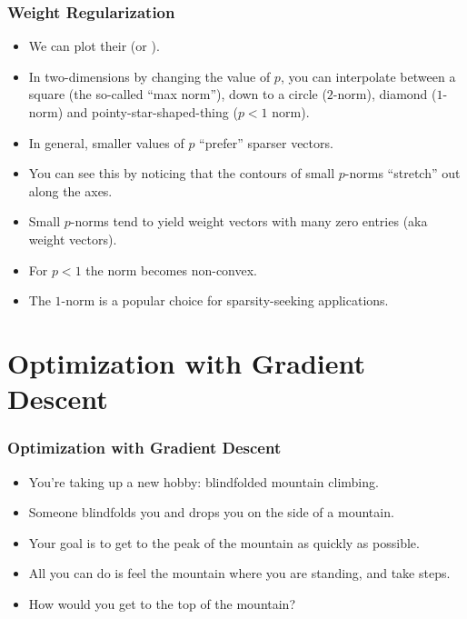 \documentclass[trans]{beamer}
\begin{document}
\begin{frame}
  \frametitle{Weight Regularization}
\begin{itemize}
\item
We can plot their 
(or ).
\item In two-dimensions by changing the value of $p$, you can interpolate between a
square (the so-called ``max norm''), down to a circle ($2$-norm),
diamond ($1$-norm) and pointy-star-shaped-thing ($p<1$ norm).
\item
In general, smaller values of $p$ ``prefer'' sparser vectors.  
\item You can
see this by noticing that the contours of small $p$-norms ``stretch''
out along the axes.
\item Small $p$-norms tend
to yield weight vectors with many zero entries (aka 
weight vectors). 
\item For $p<1$ the norm becomes
non-convex.  
\item The $1$-norm is a
popular choice for sparsity-seeking applications.

\end{itemize}
\end{frame}
\section{Optimization with Gradient Descent}

\begin{frame}
  \frametitle{Optimization with Gradient Descent}
\begin{itemize}
\item
You're taking up a new hobby:
blindfolded mountain climbing.  
\item Someone blindfolds you and drops you
on the side of a mountain.  
\item Your goal is to get to the peak of the
mountain as quickly as possible. 
\item  All you can do is feel the mountain
where you are standing, and take steps. 
\item  How would you get to the top
of the mountain?  
\end{itemize}
\end{frame}
\end{document}
